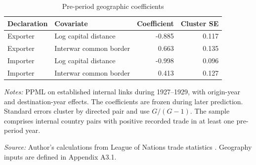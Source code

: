 \begin{table}[!htbp]\centering
\caption{Pre-period geographic coefficients}\label{tab:app_geography_coefficients}
\begin{threeparttable}\small\setlength{\tabcolsep}{4pt}
\begin{tabular}{@{}llrr@{}}
\toprule
Declaration & Covariate & Coefficient & Cluster SE \\
\midrule
Exporter & Log capital distance & -0.885 & 0.117 \\
Exporter & Interwar common border & 0.663 & 0.135 \\
Importer & Log capital distance & -0.998 & 0.096 \\
Importer & Interwar common border & 0.413 & 0.127 \\
\bottomrule
\end{tabular}
\begin{tablenotes}[flushleft]\footnotesize\item \textit{Notes:} PPML on established internal links during 1927--1929, with origin-year and destination-year effects. The coefficients are frozen during later prediction. Standard errors cluster by directed pair and use $G/(G-1)$. The sample comprises internal country pairs with positive recorded trade in at least one pre-period year.
\item \textit{Source:} Author's calculations from League of Nations trade statistics \parencite{league1930,league1936,league1938}. Geography inputs are defined in Appendix A3.1.
\end{tablenotes}\end{threeparttable}\end{table}
